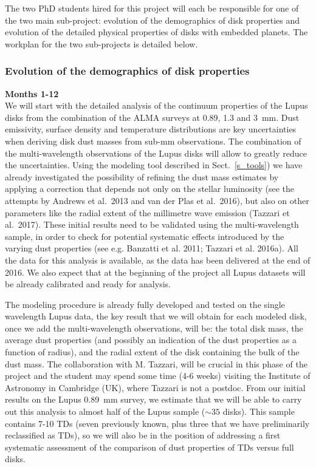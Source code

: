 \documentclass[10pt,fleqn,twoside]{article}
\begin{document}
The two PhD students hired for this project will each be responsible for one of the two main sub-project:
evolution of the demographics of disk properties and evolution of the detailed physical properties of disks with embedded planets. The workplan for the two sub-projects is detailed below.

\subsubsection{Evolution of the demographics of disk properties}

{\Tcol\bf Months 1-12}\\

We will start with the detailed analysis of the continuum properties of the Lupus disks from the combination of the ALMA surveys at 0.89, 1.3 and 3~mm. Dust emissivity, surface density and temperature
distributions are key uncertainties when deriving disk dust masses from sub-mm observations. The combination of the multi-wavelength observations of the Lupus disks will allow to greatly reduce the 
uncertainties. Using the modeling tool described in Sect.~\ref{s_tools}) we have already investigated the
possibility of refining the dust mass estimates by applying a correction that depends not only on the stellar luminosity (see the attempts by Andrews et al.~2013 and van der Plas et al.~2016), but also on other parameters like the radial extent of the millimetre wave emission (Tazzari et al.~2017). These initial results need to be validated using the multi-wavelength sample, in order to check for potential systematic effects introduced by the varying dust properties (see e.g. Banzatti et al. 2011; Tazzari et al. 2016a). All the data for this analysis is available, as the data has been delivered at the end of 2016. We also expect that at the beginning of the project all Lupus datasets will be already calibrated and ready for analysis.

The modeling procedure is already fully developed and tested on the single wavelength Lupus data, the key result that we will obtain for each modeled disk, once we add the multi-wavelength observations, will be: the total disk mass, the average dust properties (and possibly an indication of the dust properties as a function of radius), and the radial extent of the disk containing the bulk of the dust mass. The collaboration with M. Tazzari, will be crucial in this phase of the project and the student may spend 
some time (4-6 weeks) visiting the Institute of Astronomy in Cambridge (UK), where Tazzari is not a postdoc. From our initial results on the Lupus 0.89~mm survey, we estimate that  we will be able to carry out this analysis to almost half of the Lupus sample ($\sim 35$ disks). This sample contains 7-10 TDs (seven previously known, plus three that we have preliminarily reclassified as TDs), so we will also be in the position of addressing a first systematic assessment of the comparison of dust properties of TDs versus full disks.
\end{document}
